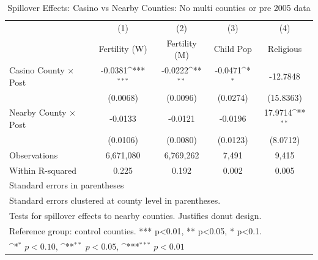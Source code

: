 \begin{table}[htbp]\centering
\def\sym#1{\ifmmode^{#1}\else\(^{#1}\)\fi}
\caption{Spillover Effects: Casino vs Nearby Counties: No multi counties or pre 2005 data}
\begin{tabular}{l*{4}{c}}
\hline\hline
            &\multicolumn{1}{c}{(1)}&\multicolumn{1}{c}{(2)}&\multicolumn{1}{c}{(3)}&\multicolumn{1}{c}{(4)}\\
            &\multicolumn{1}{c}{Fertility (W)}&\multicolumn{1}{c}{Fertility (M)}&\multicolumn{1}{c}{Child Pop}&\multicolumn{1}{c}{Religious}\\
\hline
Casino County × Post&     -0.0381\sym{***}&     -0.0222\sym{**} &     -0.0471\sym{*}  &    -12.7848         \\
            &    (0.0068)         &    (0.0096)         &    (0.0274)         &   (15.8363)         \\
[1em]
Nearby County × Post&     -0.0133         &     -0.0121         &     -0.0196         &     17.9714\sym{**} \\
            &    (0.0106)         &    (0.0080)         &    (0.0123)         &    (8.0712)         \\
\hline
Observations&   6,671,080         &   6,769,262         &       7,491         &       9,415         \\
Within R-squared&       0.225         &       0.192         &       0.002         &       0.005         \\
\hline\hline
\multicolumn{5}{l}{\footnotesize Standard errors in parentheses}\\
\multicolumn{5}{l}{\footnotesize Standard errors clustered at county level in parentheses.}\\
\multicolumn{5}{l}{\footnotesize Tests for spillover effects to nearby counties. Justifies donut design.}\\
\multicolumn{5}{l}{\footnotesize Reference group: control counties. *** p<0.01, ** p<0.05, * p<0.1.}\\
\multicolumn{5}{l}{\footnotesize \sym{*} \(p<0.10\), \sym{**} \(p<0.05\), \sym{***} \(p<0.01\)}\\
\end{tabular}
\end{table}
